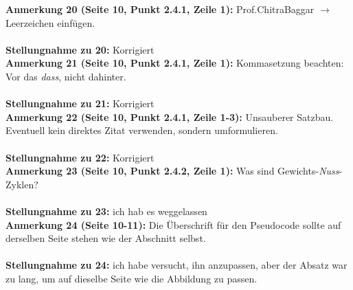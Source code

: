 \documentclass[a4paper,12pt]{book}
\begin{document}
\noindent
\textbf{Anmerkung 20 (Seite 10, Punkt 2.4.1, Zeile 1):}
Prof.ChitraBaggar $\rightarrow$ Leerzeichen einfügen. 
\\ \\
\textbf{Stellungnahme zu 20:} Korrigiert
\\

\noindent
\textbf{Anmerkung 21 (Seite 10, Punkt 2.4.1, Zeile 1):}
Kommasetzung beachten: Vor das \emph{dass}, nicht dahinter. 
\\ \\
\textbf{Stellungnahme zu 21:} Korrigiert
\\

\noindent
\textbf{Anmerkung 22 (Seite 10, Punkt 2.4.1, Zeile 1-3):}
Unsauberer Satzbau. Eventuell kein direktes Zitat verwenden, sondern umformulieren.
\\ \\
\textbf{Stellungnahme zu 22:} Korrigiert
\\

\noindent
\textbf{Anmerkung 23 (Seite 10, Punkt 2.4.2, Zeile 1):}
Was sind Gewichts-\emph{Nuss}-Zyklen? \\
\\
\textbf{Stellungnahme zu 23:} ich hab es weggelassen
\\

\noindent
\textbf{Anmerkung 24 (Seite 10-11):}
Die Überschrift für den Pseudocode sollte auf derselben Seite stehen wie der Abschnitt selbst. \\ \\
\textbf{Stellungnahme zu 24:} ich habe versucht, ihn anzupassen, aber der Absatz war zu lang, um auf dieselbe Seite wie die Abbildung zu passen.
\\
\end{document}
